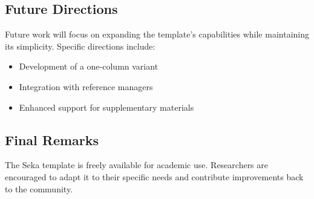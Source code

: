 \subsection{Future Directions}

Future work will focus on expanding the template's capabilities while maintaining its simplicity. Specific directions include:

\begin{itemize}
    \item Development of a one-column variant
    \item Integration with reference managers
    \item Enhanced support for supplementary materials
\end{itemize}

\subsection{Final Remarks}

The Seka template is freely available for academic use. Researchers are encouraged to adapt it to their specific needs and contribute improvements back to the community.
